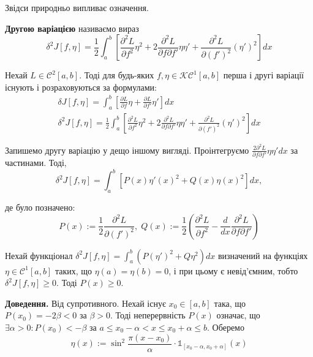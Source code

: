 \documentclass[14pt]{extarticle}
\newcommand{\<}{\langle}
\renewcommand{\>}{\rangle}
\theoremstyle{mystyle}{\newtheorem{definition}{Definition}[section]}
\theoremstyle{mystyle}{\newtheorem{proposition}[definition]{Proposition}}
\theoremstyle{mystyle}{\newtheorem{theorem}[definition]{Theorem}}
\theoremstyle{mystyle}{\newtheorem{lemma}[definition]{Lemma}}
\theoremstyle{mystyle}{\newtheorem{corollary}[definition]{Corollary}}
\theoremstyle{mystyle}{\newtheorem*{remark}{Remark}}
\theoremstyle{mystyle}{\newtheorem*{remarks}{Remarks}}
\theoremstyle{mystyle}{\newtheorem*{example}{Example}}
\theoremstyle{mystyle}{\newtheorem*{examples}{Examples}}
\theoremstyle{definition}{\newtheorem*{exercise}{Exercise}}
\theoremstyle{cstyle}{\newtheorem*{cthm}{}}
\theoremstyle{warn}
\begin{document}
Звідси природньо випливає означення.

\begin{definition}
    \textbf{Другою варіацією} називаємо вираз
    \begin{equation}
        \delta^2J[f,\eta] = \frac{1}{2}\int_a^b\left[\frac{\partial^2 L}{\partial f^2}\eta^2 + 2\frac{\partial^2 L}{\partial f\partial f'}\eta\eta' + \frac{\partial^2 L}{\partial (f')^2}(\eta')^2\right]dx
    \end{equation}
\end{definition}

\begin{theorem}
    Нехай $L \in \mathcal{C}^2[a,b]$. Тоді для будь-яких $f,\eta \in \mathcal{KC}^1[a,b]$ перша і другі варіації існують і розраховуються за формулами:
    \begin{gather}
        \delta J[f,\eta] = \int_a^b\left[\frac{\partial L}{\partial f}\eta + \frac{\partial L}{\partial f'}\eta'\right]dx \\
        \delta^2 J[f,\eta] = \frac{1}{2}\int_a^b\left[\frac{\partial^2 L}{\partial f^2}\eta^2 + 2\frac{\partial^2 L}{\partial f\partial f'}\eta\eta' + \frac{\partial^2 L}{\partial (f')^2}(\eta')^2\right]dx
    \end{gather}
\end{theorem}

Запишемо другу варіацію у дещо іншому вигляді. Проінтегруємо $\frac{2\partial^2 L}{\partial f\partial f'}\eta\eta'dx$ за частинами. Тоді,
\begin{equation}
    \delta^2 J[f,\eta] = \int_a^b[P(x)\eta'(x)^2 + Q(x)\eta(x)^2]dx,
\end{equation}

де було позначено:
\begin{equation}
    P(x) := \frac{1}{2} \frac{\partial^2 L}{\partial (f')^2}, \; Q(x) := \frac{1}{2}\left(\frac{\partial^2 L}{\partial f^2} - \frac{d}{dx}\frac{\partial^2 L}{\partial f\partial f'}\right)
\end{equation}

\begin{theorem}
    Нехай функціонал $\delta^2 J[f,\eta] = \int_a^b (P(\eta')^2 + Q\eta^2)dx$ визначений на функціях $\eta \in \mathcal{C}^1[a,b]$ таких, що $\eta(a)=\eta(b)=0$, і при цьому є невід'ємним, тобто $\delta^2 J[f,\eta] \geq 0$. Тоді $P(x) \geq 0$.
\end{theorem}

\textbf{Доведення.} Від супротивного. Нехай існує $x_0 \in [a,b]$ така, що $P(x_0) = -2\beta < 0$ за $\beta>0$. Тоді неперервність $P(x)$ означає, що $\exists \alpha>0: P(x_0)<-\beta$ за $a \leq x_0-\alpha < x \leq x_0+\alpha \leq b$. Оберемо
\begin{equation}
    \eta(x) := \sin^2 \frac{\pi(x-x_0)}{\alpha}\cdot\mathds{1}_{[x_0-\alpha,x_0+\alpha]}(x)
\end{equation}
\end{document}
